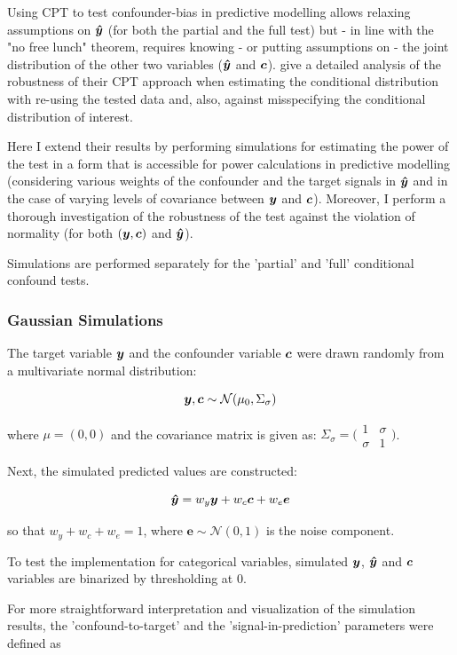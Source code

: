 \documentclass{article}
\begin{document}
Using CPT to test confounder-bias in predictive modelling allows relaxing assumptions on $\boldsymbol{\hat{y}}$ (for both the partial and the full test) but - in line with the "no free lunch" theorem, requires knowing - or putting assumptions on - the joint distribution of the other two variables ($\boldsymbol{\hat{y}}$ and $\boldsymbol{c}$). 
\cite{berrett2020conditional} give a detailed analysis of the robustness of their CPT approach when estimating the conditional distribution with re-using the tested data and, also, against misspecifying the conditional distribution of interest.

Here I extend their results by performing simulations for estimating the power of the test in a form that is accessible for power calculations in predictive modelling (considering various weights of the confounder and the target signals in $\boldsymbol{\hat{y}}$ and in the case of varying levels of covariance between $\boldsymbol{y}$ and $\boldsymbol{c}$).
Moreover, I perform a thorough investigation of the robustness of the test against the violation of normality (for both $(\boldsymbol{y}, \boldsymbol{c})$ and $\boldsymbol{\hat{y}}$).

Simulations are performed separately for the 'partial' and 'full' conditional confound tests.

\subsubsection*{Gaussian Simulations}
The target variable $\boldsymbol{y}$ and the confounder variable $\boldsymbol{c}$ were drawn randomly from a multivariate normal distribution:

$$ \boldsymbol{y}, \boldsymbol{c} \sim \mathcal{N}(\mu_0, \Sigma_\sigma) $$

where $\mu=(0, 0)$ and the covariance matrix is given as:
$\Sigma_\sigma = \big(\begin{smallmatrix}
  1 & \sigma\\
  \sigma & 1
\end{smallmatrix}\big)$.

Next, the simulated predicted values are constructed:

$$ \boldsymbol{\hat{y}} = w_y \boldsymbol{y} + w_c \boldsymbol{c} + w_e \boldsymbol{e}$$

so that $w_y + w_c + w_e = 1$, where $\boldsymbol{e} \sim \mathcal{N}(0,1)$ is the noise component.

To test the implementation for categorical variables, simulated $\boldsymbol{y}$, $\boldsymbol{\hat{y}}$ and $\boldsymbol{c}$ variables are binarized by thresholding at 0.

For more straightforward interpretation and visualization of the simulation results, the 'confound-to-target' and the 'signal-in-prediction' parameters were defined as
\end{document}

